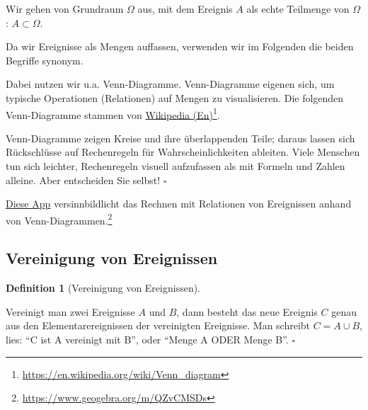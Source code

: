 \documentclass[
  ngerman,
  letterpaper,
  twoside,
  open=any]{scrbook}
\theoremstyle{definition}
\theoremstyle{plain}
\theoremstyle{definition}
\theoremstyle{definition}
\newtheorem{definition}{Definition}[chapter]
\theoremstyle{remark}
\begin{document}
Wir gehen von Grundraum \(\Omega\) aus, mit dem Ereignis \(A\) als echte
Teilmenge von \(\Omega\): \(A \subset \Omega\).

Da wir Ereignisse als Mengen auffassen, verwenden wir im Folgenden die
beiden Begriffe synonym.

Dabei nutzen wir u.a. Venn-Diagramme. Venn-Diagramme eigenen sich, um
typische Operationen (Relationen) auf Mengen zu visualisieren. Die
folgenden Venn-Diagramme stammen von
\href{https://en.wikipedia.org/wiki/Venn_diagram}{Wikipedia
(En)}\footnote{\url{https://en.wikipedia.org/wiki/Venn_diagram}}.

\begin{tcolorbox}[enhanced jigsaw, arc=.35mm, bottomrule=.15mm, bottomtitle=1mm, breakable, colback=white, colbacktitle=quarto-callout-note-color!10!white, colframe=quarto-callout-note-color-frame, coltitle=black, left=2mm, leftrule=.75mm, opacityback=0, opacitybacktitle=0.6, rightrule=.15mm, title=\textcolor{quarto-callout-note-color}{\faInfo}\hspace{0.5em}{Wozu sind die Venn-Diagramme gut? Warum soll ich die lernen?}, titlerule=0mm, toprule=.15mm, toptitle=1mm]

Venn-Diagramme zeigen Kreise und ihre überlappenden Teile; daraus lassen
sich Rückschlüsse auf Rechenregeln für Wahrscheinlichkeiten ableiten.
Viele Menschen tun sich leichter, Rechenregeln visuell aufzufassen als
mit Formeln und Zahlen alleine. Aber entscheiden Sie selbst! \(\square\)

\end{tcolorbox}

\href{https://www.geogebra.org/m/QZvCMSDs}{Diese App} versinnbildlicht
das Rechnen mit Relationen von Ereignissen anhand von
Venn-Diagrammen.\footnote{\url{https://www.geogebra.org/m/QZvCMSDs}}

\subsection{Vereinigung von
Ereignissen}\label{vereinigung-von-ereignissen}

\begin{definition}[Vereinigung von
Ereignissen]\protect\hypertarget{def-mengen-verein}{}\label{def-mengen-verein}

Vereinigt man zwei Ereignisse \(A\) und \(B\), dann besteht das neue
Ereignis \(C\) genau aus den Elementarereignissen der vereinigten
Ereignisse. Man schreibt \(C = A \cup B\), lies: \enquote{C ist A
vereinigt mit B}, oder \enquote{Menge A ODER Menge B}. \(\square\)

\end{definition}
\end{document}
